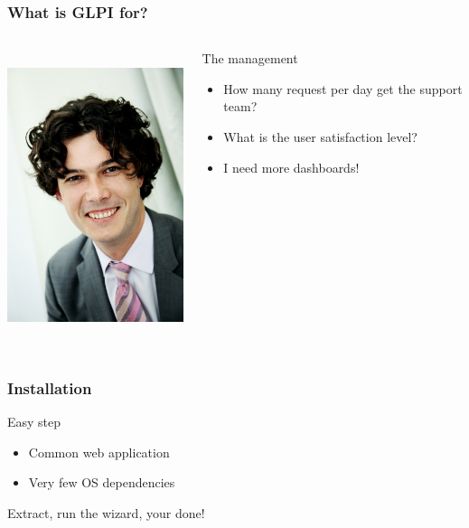 \documentclass{beamer}
\begin{document}
\begin{frame}
    \frametitle{What is GLPI for?}

 \begin{columns}
 \begin{column}{0.15\textwidth}
         \includegraphics[height=8.5cm]{./pics/manager.jpg}
 \end{column}
 \begin{column}{1.25\textwidth}
    \begin{block}{The management}
        \begin{itemize}
            \item How many request per day get the support team?
            \item What is the user satisfaction level?
            \item I need more dashboards!
        \end{itemize}
    \end{block}
 \end{column}
\end{columns}


\end{frame}




\begin{frame}
    \frametitle{Installation}

    \begin{block}{Easy step}
        \begin{itemize}
            \item Common web application
            \item Very few OS dependencies
        \end{itemize}
    \end{block}

    Extract, run the wizard, your done!





\end{frame}
\end{document}
